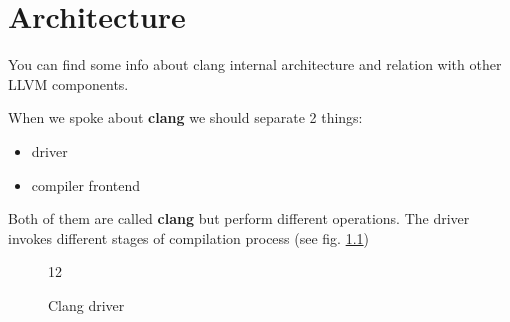 \chapter{Architecture}

You can find some info about clang internal architecture and relation
with other LLVM components.

When we spoke about \textbf{clang} we should separate 2 things:
\begin{itemize}
\item driver
\item compiler frontend 
\end{itemize}
Both of them are called \textbf{clang} but perform different
operations. The driver invokes different stages of compilation process
(see fig. \ref{fig:clang_driver})
\begin{figure}
\begin{center}
12
\end{center}
  \caption{Clang driver}
  \label{fig:clang_driver}
\end{figure}
